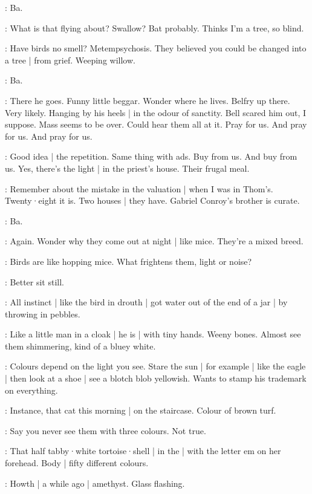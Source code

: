 \bat:
Ba.

\BloomCurrent:
What is that flying about?
Swallow?
Bat probably.
Thinks I'm a tree,
so blind.

\BloomAbstract:
Have birds
no smell?
Metempsychosis.
They believed
you could be changed into a tree |
from grief.
Weeping willow.

\bat:
Ba.

\BloomCurrent:
There he goes.
Funny little beggar.
Wonder where he lives.%
Belfry up there.
Very likely.
Hanging by his heels |
in the odour of sanctity.
Bell scared him out,
I suppose.
Mass seems to be over.
Could hear them all at it.
Pray for us.
And pray for us.
And pray for us.

\BloomAbstract:
Good idea |
the repetition.
Same thing with ads.
Buy from us.
And buy from us.
Yes,
there's the light |
in the priest's house.
Their frugal meal.

\BloomHist:
Remember about the mistake in the valuation |
when I was in Thom's.
Twenty·eight it is.
Two houses |
they have.
Gabriel Conroy's brother is curate.

\bat:
Ba.

\BloomCurrent:
Again.
Wonder why they come out at night |
like mice.
They're a mixed breed.

\BloomAbstract:
Birds are
like hopping mice.
What frightens them,
light or noise?

\BloomCurrent:
Better sit still.

\BloomAbstract:
All instinct |
like the bird in drouth |
got water out of the end of a jar |
by throwing in pebbles.%

\BloomCurrent:
Like a little man in a cloak |
he is |
with tiny hands.
Weeny bones.
Almost see them shimmering,
kind of a bluey white.

\BloomAbstract:
Colours depend on the light you see.
Stare the sun |
for example |
like the eagle |
then look at a shoe |
see a blotch blob yellowish.
Wants to stamp his trademark on everything.

\BloomToday:
Instance,
that cat this morning |
on the staircase.
Colour of brown turf.

\BloomAbstract:
Say you never see them with three colours.
Not true.

\BloomHist:
That half tabby·white tortoise·shell |
in the  |
with the letter em on her forehead.
Body |
fifty different colours.

\BloomCurrent:
Howth |
a while ago |
amethyst.
Glass flashing.

